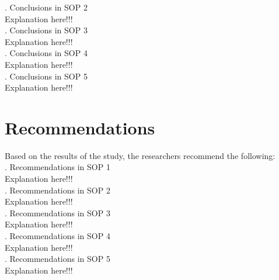 . Conclusions in SOP 2 \\
\indent Explanation here!!! \lipsum[1] \\

. Conclusions in SOP 3 \\
\indent Explanation here!!! \lipsum[1] \\

. Conclusions in SOP 4 \\
\indent Explanation here!!! \lipsum[1] \\

. Conclusions in SOP 5 \\
\indent Explanation here!!! \lipsum[1] \\


\section{Recommendations}

Based on the results of the study, the researchers recommend the following: \\

. Recommendations in SOP 1 \\
\indent Explanation here!!! \lipsum[1] \\

. Recommendations in SOP 2 \\
\indent Explanation here!!! \lipsum[1] \\

. Recommendations in SOP 3 \\
\indent Explanation here!!! \lipsum[1] \\

. Recommendations in SOP 4 \\
\indent Explanation here!!! \lipsum[1] \\

. Recommendations in SOP 5 \\
\indent Explanation here!!! \lipsum[1] \\

